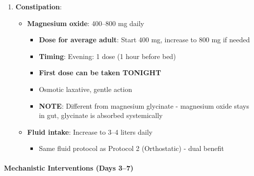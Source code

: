 \begin{enumerate}
\begin{itemize}
        \item \textbf{Lifestyle modification}: Elevate head of bed 6--8 inches
        \begin{itemize}
            \item Start TONIGHT - use bed risers or extra pillows
        \end{itemize}
    \end{itemize}

    \item \textbf{Constipation}:
    \begin{itemize}
        \item \textbf{Magnesium oxide}: 400--800 mg daily
        \begin{itemize}
            \item \textbf{Dose for average adult}: Start 400 mg, increase to 800 mg if needed
            \item \textbf{Timing}: Evening: 1 dose (1 hour before bed)
            \item \textbf{First dose can be taken TONIGHT}
            \item Osmotic laxative, gentle action
            \item \textbf{NOTE}: Different from magnesium glycinate - magnesium oxide stays in gut, glycinate is absorbed systemically
        \end{itemize}

        \item \textbf{Fluid intake}: Increase to 3--4 liters daily
        \begin{itemize}
            \item Same fluid protocol as Protocol 2 (Orthostatic) - dual benefit
        \end{itemize}
    \end{itemize}
\end{enumerate}

\paragraph{Mechanistic Interventions (Days 3--7)}


